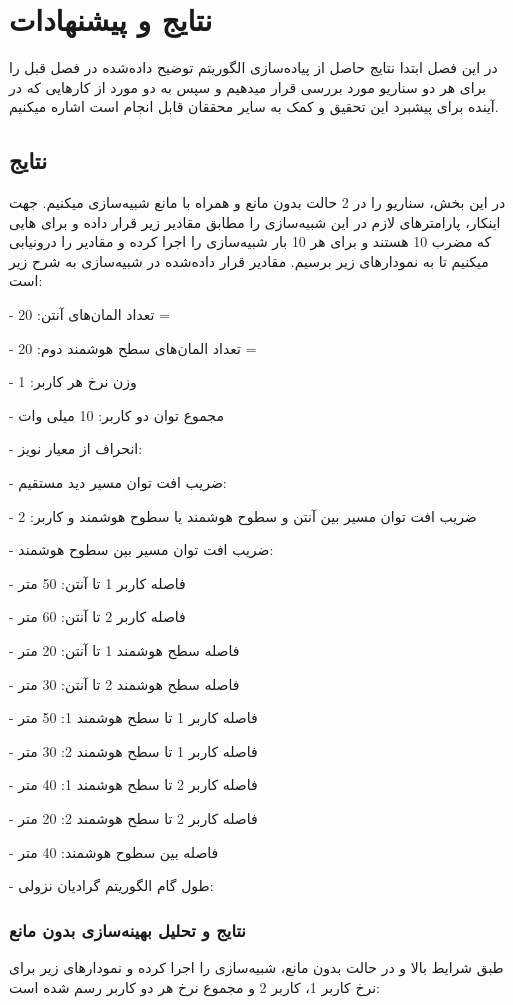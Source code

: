 \chapter{نتایج و پیشنهادات}
در این فصل ابتدا نتایج حاصل از پیاده‌سازی الگوریتم توضیح داده‌شده در فصل قبل را برای هر دو سناریو مورد بررسی قرار میدهیم و سپس به دو مورد از کارهایی که در آینده برای پیشبرد این تحقیق و کمک به سایر محققان قابل انجام است اشاره میکنیم.
\newpage
\section{نتایج}
در این بخش، سناریو را در 2 حالت بدون مانع و همراه با مانع شبیه‌سازی میکنیم. جهت اینکار، پارامترهای لازم در این شبیه‌سازی را مطابق مقادیر زیر قرار داده و برای  هایی که مضرب 10 هستند و برای هر  10 بار شبیه‌سازی را اجرا کرده و مقادیر را درونیابی میکنیم تا به نمودارهای زیر برسیم.
مقادیر قرار داده‌شده در شبیه‌سازی به شرح زیر است:

	- تعداد المان‌های آنتن: 20 = 
	
	- تعداد المان‌های سطح هوشمند دوم: 20 = 
	
	- وزن نرخ هر کاربر: 1
	
	- مجموع توان دو کاربر: 10 میلی وات
	
	- انحراف از معیار نویز: 
	
	- ضریب افت توان مسیر دید مستقیم: 
	
	- ضریب افت توان مسیر بین آنتن و سطوح هوشمند یا سطوح هوشمند و کاربر: 2
	
	- ضریب افت توان مسیر بین سطوح هوشمند: 
	
	- فاصله‌ کاربر 1 تا آنتن: 50 متر
	
	- فاصله‌ کاربر 2 تا آنتن: 60 متر
	
	- فاصله سطح هوشمند 1 تا آنتن: 20 متر
	
	- فاصله سطح هوشمند 2 تا آنتن: 30 متر
	
	- فاصله کاربر 1 تا سطح هوشمند 1: 50 متر

	- فاصله کاربر 1 تا سطح هوشمند 2: 30 متر
	
	- فاصله کاربر 2 تا سطح هوشمند 1: 40 متر
	
	- فاصله کاربر 2 تا سطح هوشمند 2: 20 متر
	
	- فاصله بین سطوح هوشمند: 40 متر
	
	- طول گام الگوریتم گرادیان نزولی: 
	
\newpage
\subsection{نتایج و تحلیل بهینه‌سازی بدون مانع}
طبق شرایط بالا و در حالت بدون مانع، شبیه‌سازی را اجرا کرده و نمودارهای زیر برای نرخ کاربر 1، کاربر 2 و مجموع نرخ هر دو کاربر رسم‌ شده است:

